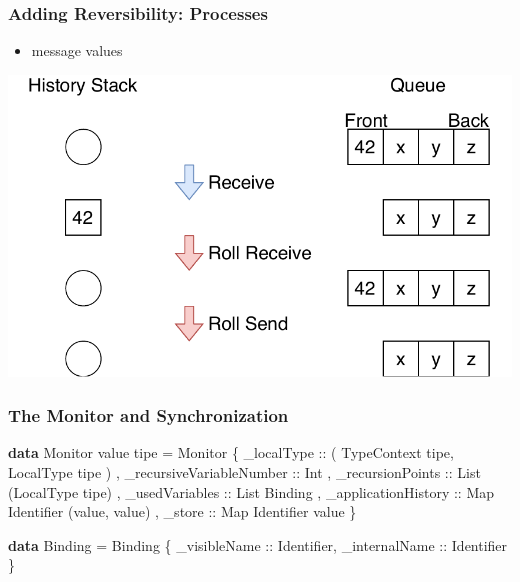 \documentclass[12pt]{beamer}
\newenvironment{Shaded}{}{}
\newcommand{\KeywordTok}[1]{\textcolor[rgb]{0.00,0.44,0.13}{\textbf{#1}}}
\newcommand{\DataTypeTok}[1]{\textcolor[rgb]{0.56,0.13,0.00}{#1}}
\newcommand{\OtherTok}[1]{\textcolor[rgb]{0.00,0.44,0.13}{#1}}
\newcommand{\FunctionTok}[1]{\textcolor[rgb]{0.02,0.16,0.49}{#1}}
\newcommand{\NormalTok}[1]{#1}
\begin{document}
\begin{frame}[t]
\frametitle{Adding Reversibility: Processes}

\begin{itemize}
    \item message values
\end{itemize}
\begin{center}
\includegraphics[scale=0.60]{img/queue-history-stack.pdf}
\end{center}
\end{frame}

\begin{frame}[fragile]
\frametitle{The Monitor and Synchronization}


\begin{Shaded}
\begin{Highlighting}[]
\KeywordTok{data} \DataTypeTok{Monitor}\NormalTok{ value tipe }\FunctionTok{=} 
    \DataTypeTok{Monitor} 
\NormalTok{        \{}\OtherTok{ \_localType ::} \NormalTok{( }\DataTypeTok{TypeContext}\NormalTok{ tipe,}\DataTypeTok{ LocalType}\NormalTok{ tipe )}
\NormalTok{        ,}\OtherTok{ \_recursiveVariableNumber ::} \DataTypeTok{Int}
\NormalTok{        ,}\OtherTok{ \_recursionPoints ::} \DataTypeTok{List}\NormalTok{ (}\DataTypeTok{LocalType}\NormalTok{ tipe)}
\NormalTok{        ,}\OtherTok{ \_usedVariables ::} \DataTypeTok{List} \DataTypeTok{Binding} 
\NormalTok{        ,}\OtherTok{ \_applicationHistory ::} \DataTypeTok{Map} \DataTypeTok{Identifier}\NormalTok{ (value, value)}
\NormalTok{        ,}\OtherTok{ \_store ::} \DataTypeTok{Map} \DataTypeTok{Identifier}\NormalTok{ value }
\NormalTok{        \}}

\KeywordTok{data} \DataTypeTok{Binding} \FunctionTok{=} 
    \DataTypeTok{Binding}\NormalTok{ \{}\OtherTok{ \_visibleName ::} \DataTypeTok{Identifier}\NormalTok{,}\OtherTok{ _internalName ::} \DataTypeTok{Identifier}\NormalTok{ \} }
\end{Highlighting}
\end{Shaded}

\end{frame}
\end{document}
